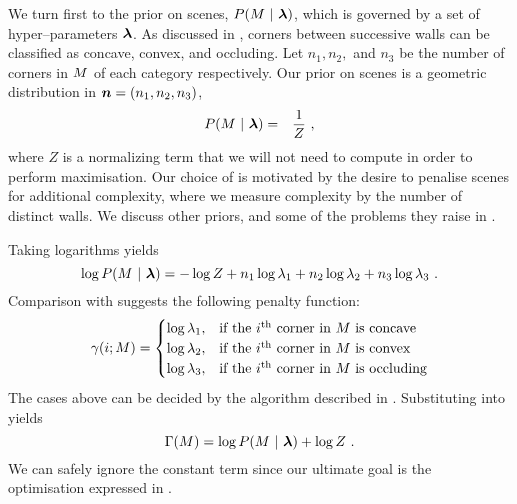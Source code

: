 We turn first to the prior on scenes, $P(\Scene~|~\Penalties)$, which
is governed by a set of hyper--parameters $\Penalties$. As discussed in
, corners between successive walls can be
classified as concave, convex, and occluding. Let $n_1, n_2,$ and $n_3$
be the number of corners in $\Scene$ of each category
respectively. Our prior on scenes is a geometric distribution in
$\vect{n}=(n_1,n_2,n_3)$,
\begin{eqnarray}
  \label{eq:scene-prior}
  P(\Scene ~|~ \Penalties) &=& \frac{1}{Z} ~,
\end{eqnarray}
where $Z$ is a normalizing term that we will not need to compute in
order to perform maximisation. Our choice of  is
motivated by the desire to penalise scenes for additional complexity,
where we measure complexity by the number of distinct walls. We
discuss other priors, and some of the problems they raise in
.

Taking logarithms yields
\begin{equation}
  \label{eq:log-scene-prior}
  \log P(\Scene ~|~ \Penalties) =
    -\log Z +
    n_1\log\PenaltyConc + 
    n_2\log\PenaltyConv + 
    n_3\log\PenaltyOccl~.
\end{equation}
Comparison with  suggests the following
penalty function:
\begin{equation}
  \label{eq:corner-penalty}
  \CornerPenalty(i;\Scene) = 
  \begin{cases}
    \log \PenaltyConc, &
      \mbox{if the $i$\th corner in $\Scene$ is concave} \\
    \log \PenaltyConv, &
      \mbox{if the $i$\th corner in $\Scene$ is convex} \\
    \log \PenaltyOccl, &
      \mbox{if the $i$\th corner in $\Scene$ is occluding} \\
  \end{cases}
\end{equation}
The cases above can be decided by the algorithm described in
. Substituting  into
 yields
\begin{equation}
  \ScenePenalty(\Scene) = \log P(\Scene ~|~ \Penalties) + \log Z~.
\end{equation}
We can safely ignore the constant term since our ultimate goal is the
optimisation expressed in .

